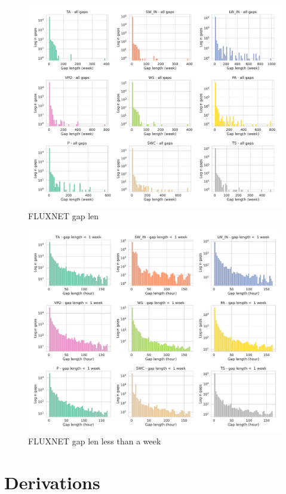 \documentclass{article}
\newcommand{\imgwidth}{6in}
\let\Oldsection\section
\renewcommand{\section}{\FloatBarrier\Oldsection}
\begin{document}
\begin{figure}
\centerline{\includegraphics[width=\imgwidth]{gap_len_dist}}
\caption{FLUXNET gap len}
\label{fig:gap_len_dist}
\end{figure}
\begin{figure}
\centerline{\includegraphics[width=\imgwidth]{gap_len_dist_small}}
\caption{FLUXNET gap len less than a week}
\label{fig:gap_len_dist_small}
\end{figure}

\section{Derivations}
\end{document}
